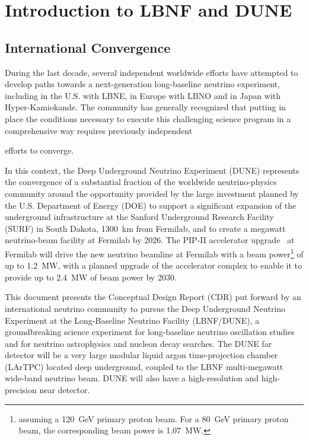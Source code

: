 \chapter{Introduction to LBNF and DUNE}
\label{ch:project-overview}

\section{International Convergence}

During the last decade, several independent worldwide efforts have attempted to develop paths towards a next-generation long-baseline neutrino experiment, including in the U.S. with LBNE, in Europe with LBNO and in Japan with Hyper-Kamiokande. The community has generally recognized that putting in place  
the conditions necessary to 
execute this challenging science program in a comprehensive way requires previously independent 

efforts to converge. 

In this context, the Deep Underground Neutrino Experiment (DUNE) represents the convergence of a substantial fraction of the worldwide neutrino-physics community around the 
opportunity provided by the 
large investment planned by the U.S. Department of Energy (DOE) to support 
a significant expansion of the underground infrastructure at the Sanford Underground Research 
Facility (SURF) in South Dakota, \SI{1300}{\km} from Fermilab, and to create a megawatt neutrino-beam facility at Fermilab by 2026.  The PIP-II accelerator upgrade~\cite{pip2-2013} at 
Fermilab will drive the new neutrino beamline at Fermilab with a beam power\footnote{assuming a \SI{120}{\GeV} primary proton beam. For a \SI{80}{\GeV} primary proton beam, the corresponding beam power is \SI{1.07}{\MW}.} of up to \SI{1.2}{\MW}, with a planned upgrade 
of the accelerator complex to enable it to provide up to \SI{2.4}{\MW} of beam power by 2030.  

This document presents 
the Conceptual Design Report (CDR) put forward by an international neutrino community to pursue 
the Deep Underground Neutrino Experiment at the Long-Baseline Neutrino Facility (LBNF/DUNE),
a groundbreaking science experiment for long-baseline neutrino oscillation studies and for neutrino astrophysics and nucleon decay searches. The DUNE far detector will be a very large modular liquid argon time-projection chamber (LArTPC) located deep underground, coupled to the LBNF multi-megawatt   
wide-band neutrino beam.   DUNE will also have a high-resolution and high-precision near detector.

